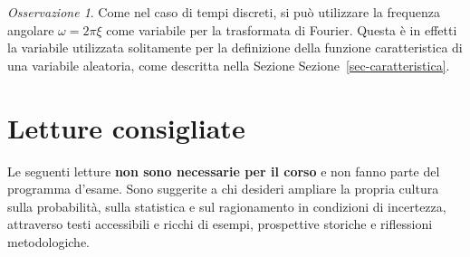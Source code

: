 \documentclass[
  italian,
  letterpaper,
]{book}
\theoremstyle{definition}
\theoremstyle{remark}
\newtheorem*{remark}{Osservazione}
\begin{document}
\begin{remark}
Come nel caso di tempi discreti, si può utilizzare la frequenza angolare
\(\omega = 2 \pi \xi\) come variabile per la trasformata di Fourier.
Questa è in effetti la variabile utilizzata solitamente per la
definizione della funzione caratteristica di una variabile aleatoria,
come descritta nella Sezione Sezione~\ref{sec-caratteristica}.
\end{remark}


\chapter*{Letture consigliate}\label{letture-consigliate}


Le seguenti letture \textbf{non sono necessarie per il corso} e non
fanno parte del programma d'esame. Sono suggerite a chi desideri
ampliare la propria cultura sulla probabilità, sulla statistica e sul
ragionamento in condizioni di incertezza, attraverso testi accessibili e
ricchi di esempi, prospettive storiche e riflessioni metodologiche.
\end{document}

